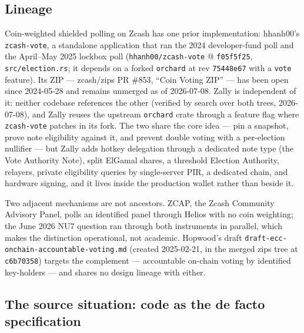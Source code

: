 \documentclass[11pt,a4paper]{article}
\theoremstyle{definition}
\begin{document}
\subsection{Lineage}\label{sec:vote-lineage}

Coin-weighted shielded polling on Zcash has one prior implementation:
hhanh00's \texttt{zcash-vote}, a standalone application that ran the 2024
developer-fund poll and the April--May 2025 lockbox poll
(\texttt{hhanh00/zcash-vote} @ \texttt{f05f5f25},
\texttt{src/election.rs}; it depends on a forked \texttt{orchard} at rev
\texttt{75448e67} with a \texttt{vote} feature). Its ZIP --- zcash/zips PR
\#853, ``Coin Voting ZIP'' --- has been open since 2024-05-28 and remains
unmerged as of 2026-07-08. Zally is independent of it: neither codebase
references the other (verified by search over both trees, 2026-07-08), and
Zally reuses the upstream \texttt{orchard} crate through a feature flag
where \texttt{zcash-vote} patches in its fork. The two share the
core idea --- pin a snapshot, prove note eligibility against it, and prevent
double voting with a per-election nullifier --- but Zally adds hotkey
delegation through a dedicated note type (the Vote Authority Note), split
ElGamal shares, a threshold Election Authority, relayers, private
eligibility queries by single-server PIR, a dedicated chain, and hardware
signing, and it lives inside the production wallet rather than beside it.

Two adjacent mechanisms are not ancestors. ZCAP, the Zcash Community
Advisory Panel, polls an identified panel through Helios with no coin
weighting; the June 2026 NU7 question ran through both instruments in
parallel, which makes the distinction operational, not academic. Hopwood's
draft \texttt{draft-ecc-onchain-accountable-voting.md} (created 2025-02-21,
in the merged zips tree at \texttt{c6b70358}) targets the complement ---
accountable on-chain voting by identified key-holders --- and shares no
design lineage with either.

\subsection{The source situation: code as the de facto specification}
\label{sec:vote-source-situation}
\end{document}
